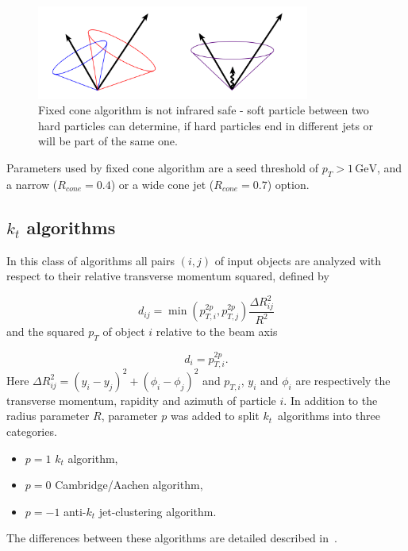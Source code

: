 \documentclass[a4paper,11pt]{report}
\newcommand{\GeV}{\,\text{GeV}}
\newcommand{\pt}{p_T}
\begin{document}
\begin{figure}[t]
  \centering
  \includegraphics[width=0.8\textwidth]{Chapter2/IRsafety}
  \caption{Fixed cone algorithm is not infrared safe - soft particle between two
  hard particles can determine, if hard particles end in different jets or will
  be part of the same one.} \label{fig:IRsafety}
\end{figure}

Parameters used by fixed cone algorithm are a seed threshold of $\pt > 1 \GeV$,
and a narrow ($R_{cone} = 0.4$) or a wide cone jet ($R_{cone} = 0.7$) option.

\subsection{$k_t$ algorithms}

In this class of algorithms all pairs $(i,j)$ of input objects are analyzed with
respect to their relative transverse momentum squared, defined by 

\begin{equation}
	d_{ij} = \min{\left( p_{T,i}^{2p} , p_{T,j}^{2p} \right)} \frac{\Delta R_{ij}^2}{R^2}
\end{equation}
and the squared $\pt$ of object $i$ relative to the beam axis

\begin{equation}
	d_i = p_{T,i}^{2p}.
\end{equation}
Here $\Delta R_{ij}^2 = (y_i - y_j)^2 + (\phi_i - \phi_j)^2$ and $p_{T,i}$,
$y_i$ and $\phi_i$ are respectively the transverse momentum, rapidity and
azimuth of particle $i$. In addition to the radius parameter $R$, parameter $p$
was added to split $k_t$~algorithms into three categories.  
\begin{itemize}
	\setlength{\itemsep}{0pt}
	\setlength{\parskip}{0pt}
	\setlength{\parsep}{0pt}
	\item $p = 1$ $k_t$ algorithm,
	\item $p = 0$ Cambridge/Aachen algorithm,
	\item $p = -1$ anti-$k_t$ jet-clustering algorithm.
\end{itemize}
The differences between these algorithms are detailed described in~\cite{ANTIKT}.  
\end{document}
